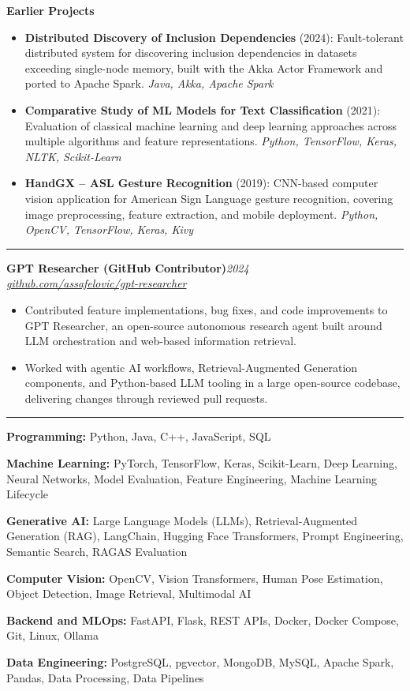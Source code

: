 \documentclass[10pt,a4paper]{article}
\renewcommand{\section}[1]{%
  \par\vspace{7pt}%
  \noindent{\large\bfseries\color{headerblue}#1}\par\vspace{2pt}%
  \noindent\hrule\par\vspace{3pt}%
}
\newcommand{\entry}[3]{%
  \noindent\textbf{#1}\hfill\textit{\small #3}\\[0pt]%
  {\small\textit{\color{darkgray}#2}}\par\vspace{2pt}%
}
\newcommand{\skill}[2]{%
  \noindent\textbf{#1:} #2\par\vspace{2pt}%
}
\newcommand{\minorproject}[4]{%
  \item \textbf{#1} (#2): #3 \textit{#4}%
}
\newcommand{\vsm}{\vspace{5pt}}
\begin{document}
\vsm
\noindent\textbf{Earlier Projects}\par\vspace{2pt}
\begin{itemize}
\minorproject{Distributed Discovery of Inclusion Dependencies}{2024}
{Fault-tolerant distributed system for discovering inclusion dependencies in datasets exceeding
single-node memory, built with the Akka Actor Framework and ported to Apache Spark.}
{Java, Akka, Apache Spark}
\minorproject{Comparative Study of ML Models for Text Classification}{2021}
{Evaluation of classical machine learning and deep learning approaches across multiple
algorithms and feature representations.}
{Python, TensorFlow, Keras, NLTK, Scikit-Learn}
\minorproject{HandGX -- ASL Gesture Recognition}{2019}
{CNN-based computer vision application for American Sign Language gesture recognition, covering
image preprocessing, feature extraction, and mobile deployment.}
{Python, OpenCV, TensorFlow, Keras, Kivy}
\end{itemize}
\section{OPEN SOURCE CONTRIBUTIONS}
\entry
{GPT Researcher (GitHub Contributor)}
{\href{https://github.com/assafelovic/gpt-researcher}{github.com/assafelovic/gpt-researcher}}
{2024}
\begin{itemize}
\item Contributed feature implementations, bug fixes, and code improvements to GPT Researcher,
an open-source autonomous research agent built around LLM orchestration and web-based
information retrieval.
\item Worked with agentic AI workflows, Retrieval-Augmented Generation components, and
Python-based LLM tooling in a large open-source codebase, delivering changes through reviewed
pull requests.
\end{itemize}
\section{TECHNICAL SKILLS}
\skill{Programming}{Python, Java, C++, JavaScript, SQL}
\skill{Machine Learning}{PyTorch, TensorFlow, Keras, Scikit-Learn, Deep Learning,
Neural Networks, Model Evaluation, Feature Engineering, Machine Learning Lifecycle}
\skill{Generative AI}{Large Language Models (LLMs), Retrieval-Augmented Generation (RAG),
LangChain, Hugging Face Transformers, Prompt Engineering, Semantic Search, RAGAS Evaluation}
\skill{Computer Vision}{OpenCV, Vision Transformers, Human Pose Estimation, Object Detection,
Image Retrieval, Multimodal AI}
\skill{Backend and MLOps}{FastAPI, Flask, REST APIs, Docker, Docker Compose, Git, Linux, Ollama}
\skill{Data Engineering}{PostgreSQL, pgvector, MongoDB, MySQL, Apache Spark, Pandas,
Data Processing, Data Pipelines}
\end{document}
